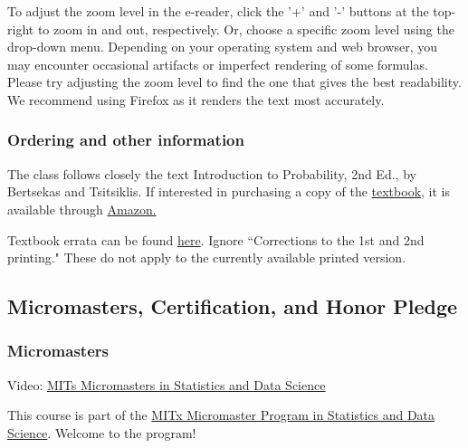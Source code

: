 \documentclass[pdftex, brazil, 12pt, twoside]{article}
\begin{document}
To adjust the zoom level in the e-reader, click the '+' and '-' buttons at the
top-right to zoom in and out, respectively. Or, choose a specific zoom level using
the drop-down menu. Depending on your operating system and web browser, you may
encounter occasional artifacts or imperfect rendering of some formulas. Please try
adjusting the zoom level to find the one that gives the best readability. We recommend
using Firefox as it renders the text most accurately.

\subsubsection{Ordering and other information}
\label{ovw0-book-ordering}

The class follows closely the text Introduction to Probability, 2nd Ed., by
Bertsekas and Tsitsiklis. If interested in purchasing a copy of the
\href{http://athenasc.com/probbook.html}{textbook},
it is available through
\href{http://www.amazon.com/Introduction-Probability-Edition-Dimitri-Bertsekas/dp/188652923X/}{Amazon.}

Textbook errata can be found \href{http://athenasc.com/prob-errata\_2ndedition.pdf}{here}.
Ignore “Corrections to the 1st and 2nd printing." These do not apply to the currently
available printed version.


\subsection{Micromasters, Certification, and Honor Pledge}
\label{ovw0-mm}

\subsubsection{Micromasters}
\label{ovw0-mm-mm}

Video: \href{https://www.youtube.com/watch?v=Xe97K6cLQZ8}{MITs Micromasters in Statistics and Data Science}

This course is part of the
\href{https://www.edx.org/micromasters/mitx-statistics-and-data-science}{MITx
  Micromaster Program in Statistics and Data Science}. Welcome to the program!
\end{document}
